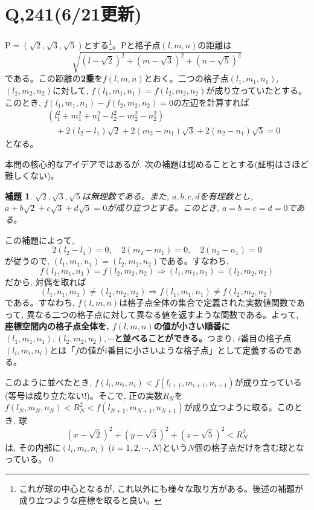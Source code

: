 \documentclass[twocolumn]{jbook}
\newtheorem{lem}[theo]{補題}
\newcommand{\beqn}{\begin{eqnarray*}}
\newcommand{\eeqn}{\end{eqnarray*}}
\newcommand{\nara}{\Rightarrow}
\newcommand{\mr}{\mathrm}
\begin{document}
\section*{Q,241(6/21更新)}
$\mr{P} = (\sqrt{2},\sqrt{3}, \sqrt{5})$とする\footnote{これが球の中心となるが, これ以外にも様々な取り方がある。後述の補題が成り立つような座標を取ると良い。}。$\mr{P}$と格子点$(l,m,n)$の距離は
\[\sqrt{(l-\sqrt{2})^2 + (m-\sqrt{3})^2 + (n-\sqrt{5})^2}\]
である。この距離の\textbf{2乗}を$f(l,m,n)$とおく。二つの格子点$(l_1,m_1,n_1)$, $(l_2,m_2,n_2)$に対して, $f(l_1,m_1,n_1) = f(l_2,m_2,n_2)$が成り立っていたとする。このとき, $f(l_1,m_1,n_1) - f(l_2,m_2,n_2) = 0$の左辺を計算すれば
\beqn
&&(l_1^2 + m_1^2 + n_1^2 - l_2^2 - m_2^2 - n_2^2) \\
&&\quad +2(l_2 - l_1)\sqrt{2}  + 2(m_2-m_1)\sqrt{3} + 2(n_2-n_1)\sqrt{5} = 0
\eeqn
となる。\par
本問の核心的なアイデアではあるが, 次の補題は認めることとする(証明はさほど難しくない)。
\begin{lem}
$\sqrt{2},\sqrt{3},\sqrt{5}$は無理数である。また, $a,b,c,d$を有理数とし, $a+b\sqrt{2} + c\sqrt{3} + d\sqrt{5} = 0$が成り立つとする。このとき, $a=b=c=d=0$である。
\end{lem}
この補題によって, 
\[2(l_2 - l_1) = 0,\quad  2(m_2-m_1) = 0,\quad 2(n_2-n_1) = 0\]
が従うので, $(l_1,m_1,n_1) = (l_2,m_2,n_2)$である。すなわち,
\[f(l_1,m_1,n_1) = f(l_2,m_2,n_2) \nara (l_1,m_1,n_1) = (l_2,m_2,n_2)\]
だから, 対偶を取れば
\[(l_1,n_1,m_1)\neq (l_2,m_2,n_2) \nara f(l_1,m_1,n_1) \neq f(l_2,m_2,n_2)\]
である。すなわち, $f(l,m,n)$は格子点全体の集合で定義された実数値関数であって, 異なる二つの格子点に対して異なる値を返すような関数である。よって, \textbf{座標空間内の格子点全体を, $f(l,m,n)$の値が小さい順番に$(l_1,m_1,n_1), (l_2,m_2,n_2),\cdots$と並べることができる。}つまり, $i$番目の格子点$(l_i,m_i,n_i)$とは「$f$の値が$i$番目に小さいような格子点」として定義するのである。\par
このように並べたとき, $f(l_i,m_i,n_i) < f(l_{i+1},m_{i+1},n_{i+1})$が成り立っている(等号は成り立たない!)。そこで, 正の実数$R_N$を$f(l_N,m_N,n_N) < R_N^2 < f(l_{N+1},m_{N+1},n_{N+1})$が成り立つように取る。このとき, 球
\[(x-\sqrt{2})^2 + (y-\sqrt{3})^2 + (z-\sqrt{5})^2 < R_N^2\]
は, その内部に$(l_i,m_i,n_i)$ ($i=1,2,\cdots, N$)という$N$個の格子点だけを含む球となっている。\qed
\end{document}
